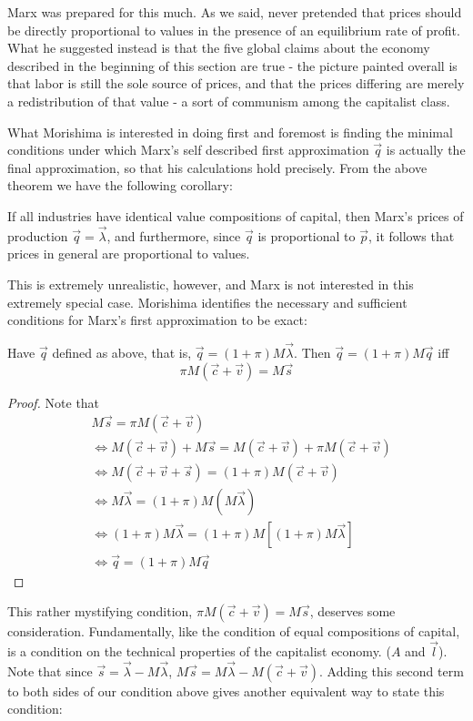 Marx was prepared for this much. As we said, never pretended that prices should be directly proportional to values in the presence of an equilibrium rate of profit. What he suggested instead is that the five global claims about the economy described in the beginning of this section are true - the picture painted overall is that labor is still the sole source of prices, and that the prices differing are merely a redistribution of that value - a sort of communism among the capitalist class. \par 
What Morishima is interested in doing first and foremost is finding the minimal conditions under which Marx's self described first approximation $\vec{q}$ is actually the final approximation, so that his calculations hold precisely. From the above theorem we have the following corollary:
\begin{corollary}
	If all industries have identical value compositions of capital, then Marx's prices of production $\vec{q} = \vec{\lambda}$, and furthermore, since $\vec{q}$ is proportional to $\vec{p}$, it follows that prices in general are proportional to values. 
\end{corollary}
This is extremely unrealistic, however, and Marx is not interested in this extremely special case. Morishima identifies the necessary and sufficient conditions for Marx's first approximation to be exact:
\begin{theorem}
	Have $\vec{q}$ defined as above, that is, $\vec{q} = (1+\pi)M\vec{\lambda}$. Then $\vec{q} = (1+\pi)M\vec{q}$ iff 
	\[ \pi M(\vec{c}+\vec{v}) = M\vec{s} \]
\end{theorem}
\begin{proof}
	Note that
	\begin{align*}
		& M\vec{s} = \pi M(\vec{c}+\vec{v}) \\
		&\iff M(\vec{c}+\vec{v})+M\vec{s} = M(\vec{c}+\vec{v}) + \pi M(\vec{c}+\vec{v}) \\
		&\iff M(\vec{c}+\vec{v}+\vec{s}) = (1+\pi)M(\vec{c}+\vec{v}) \\
		&\iff M\vec{\lambda} = (1+\pi)M(M\vec{\lambda}) \\
		&\iff (1+\pi)M\vec{\lambda} = (1+\pi)M[(1+\pi)M\vec{\lambda}] \\
		&\iff \vec{q} = (1+\pi)M\vec{q}  
	\end{align*}
\end{proof}
This rather mystifying condition, $\pi M(\vec{c}+\vec{v}) = M\vec{s}$, deserves some consideration. Fundamentally, like the condition of equal compositions of capital, is a condition on the technical properties of the capitalist economy. ($A$ and $\vec{l}$). Note that since $\vec{s} = \vec{\lambda} - M\vec{\lambda}$, $M\vec{s} = M\vec{\lambda} - M(\vec{c}+\vec{v})$. Adding this second term to both sides of our condition above gives another equivalent way to state this condition:
